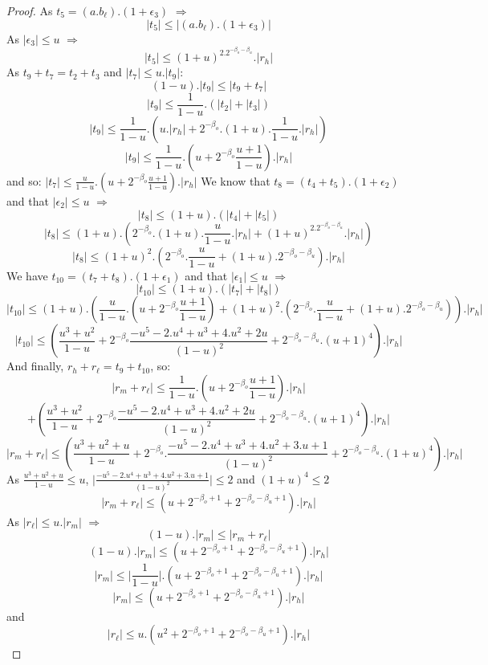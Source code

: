 \begin{proof}
As $t_5 = (a.b_{\ell}).(1+\epsilon_3)$ $\Rightarrow$
$$\lvert t_5 \rvert \le \lvert (a.b_{\ell}).(1+\epsilon_3) \rvert$$
As $\lvert \epsilon_3 \rvert \le u$ $\Rightarrow$
$$\lvert t_5 \rvert \le (1+u)^2.2^{-\beta_o -\beta_u}.\lvert r_h \rvert$$
As $t_9 + t_7 = t_2 + t_3$ and $\lvert t_7 \rvert \le u. \lvert t_9 \rvert$:
$$(1-u). \lvert t_9 \rvert \le \lvert t_9 + t_7 \rvert$$
$$ \lvert t_9 \rvert \le \frac{1}{1-u}.(\lvert t_2 \rvert + \lvert t_3 \rvert)$$
$$ \lvert t_9 \rvert \le \frac{1}{1-u}.(u. \lvert r_h \rvert + 2^{-\beta_o}.(1+u).\frac{1}{1-u}.\lvert r_h \rvert)$$
$$ \lvert t_9 \rvert \le \frac{1}{1-u}.(u+ 2^{-\beta_o}\frac{u+1}{1-u}).\lvert r_h \rvert$$ 
and so:
$ \lvert t_7 \rvert \le \frac{u}{1-u}.(u+ 2^{-\beta_o}\frac{u+1}{1-u}).\lvert r_h \rvert$
We know that $t_8 = (t_4 + t_5).(1+\epsilon_2)$ and that $\lvert \epsilon_2 \rvert \le u$ $\Rightarrow$
$$\lvert t_8 \rvert \le (1+u).(\lvert t_4 \rvert + \lvert t_5 \rvert) $$
$$\lvert t_8 \rvert \le (1+u).(2^{-\beta_o}.(1+u).\frac{u}{1-u}.\lvert r_h \rvert + (1+u)^2.2^{-\beta_o -\beta_u}.\lvert r_h \rvert) $$
$$\lvert t_8 \rvert \le (1+u)^2.(2^{-\beta_o}.\frac{u}{1-u} + (1+u).2^{-\beta_o -\beta_u}).\lvert r_h \rvert $$
We have $t_{10} = (t_7 + t_8).(1+\epsilon_1)$ and that $\lvert \epsilon_1 \rvert \le u$ $\Rightarrow$
$$\lvert t_{10} \rvert \le (1+u).(\lvert t_7 \rvert + \lvert t_8 \rvert) $$
$$\lvert t_{10} \rvert \le (1+u).(\frac{u}{1-u}.(u+ 2^{-\beta_o}\frac{u+1}{1-u}) + (1+u)^2.(2^{-\beta_o}.\frac{u}{1-u} + (1+u).2^{-\beta_o -\beta_u})).\lvert r_h \rvert $$
$$\lvert t_{10} \rvert \le(\frac{u^3+u^2}{1-u}+ 2^{-\beta_o}\frac{-u^5-2.u^4+u^3+4.u^2+2u}{(1-u)^2}+ 2^{-\beta_o -\beta_u}.(u+1)^4).\lvert r_h \rvert  $$
And finally, $r_h + r_{\ell} = t_9 + t_{10}$, so:
$$\lvert r_m + r_{\ell}  \rvert \le \frac{1}{1-u}.(u+ 2^{-\beta_o}\frac{u+1}{1-u}).\lvert r_h \rvert$$
$$ + (\frac{u^3+u^2}{1-u}+ 2^{-\beta_o}\frac{-u^5-2.u^4+u^3+4.u^2+2u}{(1-u)^2}+ 2^{-\beta_o -\beta_u}.(u+1)^4).\lvert r_h \rvert $$
$$\lvert r_m + r_{\ell}  \rvert \le (\frac{u^3 + u^2 +u}{1-u} + 2^{-\beta_o}.  \frac{-u^5-2.u^4+u^3+4.u^2+3.u+1}{(1-u)^2}  + 2^{-\beta_o -\beta_u}.(1+u)^4).\lvert r_h \rvert  $$
As $\frac{u^3+u^2+u}{1-u} \le u$, $\lvert \frac{-u^5-2.u^4+u^3+4.u^2+3.u+1}{(1-u)^2} \rvert \le 2$ and $(1+u)^4 \le 2$
$$\lvert r_m + r_{\ell}  \rvert \le (u + 2^{-\beta_o+1} + 2^{-\beta_o -\beta_u+1}).\lvert r_h \rvert  $$
As $\lvert r_{\ell} \rvert \le u. \lvert r_m \rvert$ $\Rightarrow$
$$(1 - u). \lvert r_m \rvert \le \lvert r_m + r_{\ell} \rvert$$
$$(1 - u). \lvert r_m \rvert \le (u + 2^{-\beta_o+1} + 2^{-\beta_o -\beta_u+1}).\lvert r_h \rvert$$
$$\lvert r_m \rvert \le \lvert \frac{1}{1-u} \rvert.(u + 2^{-\beta_o+1} + 2^{-\beta_o -\beta_u+1}).\lvert r_h \rvert$$
$$\lvert r_m \rvert \le (u + 2^{-\beta_o+1} + 2^{-\beta_o -\beta_u+1}).\lvert r_h \rvert$$
and 
$$\lvert r_{\ell} \rvert \le u.(u^2 + 2^{-\beta_o+1} + 2^{-\beta_o -\beta_u+1}).\lvert r_h \rvert$$
\end{proof}

